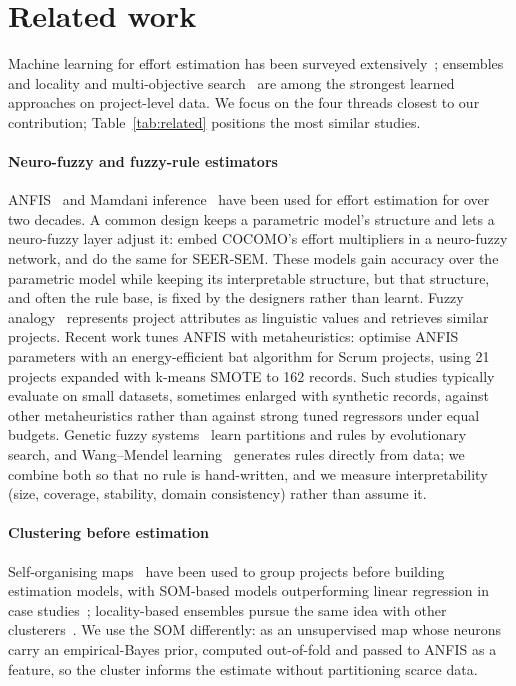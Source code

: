 \documentclass[preprint,12pt,authoryear]{elsarticle}
\begin{document}
\section{Related work}
\label{sec:related}

Machine learning for effort estimation has been surveyed extensively~\citep{wen2012slr}; ensembles and locality
\citep{minku2013ensembles} and multi-objective search~\citep{sarro2016coGEE} are among the strongest learned
approaches on project-level data.  We focus on the four threads closest to our contribution; Table~\ref{tab:related}
positions the most similar studies.

\paragraph{Neuro-fuzzy and fuzzy-rule estimators}
ANFIS~\citep{jang1993anfis} and Mamdani inference~\citep{mamdani1975} have been used for effort estimation for over
two decades.  A common design keeps a parametric model's structure and lets a neuro-fuzzy layer adjust it:
\citet{huang2007neurofuzzy} embed COCOMO's effort multipliers in a neuro-fuzzy network, and \citet{du2015seersem}
do the same for SEER-SEM.  These models gain accuracy over the parametric model while keeping its interpretable
structure, but that structure, and often the rule base, is fixed by the designers rather than learnt.  Fuzzy
analogy~\citep{idri2002fuzzyanalogy} represents project attributes as linguistic values and retrieves similar
projects.  Recent work tunes ANFIS with metaheuristics: \citet{arora2022anfis} optimise ANFIS parameters with an
energy-efficient bat algorithm for Scrum projects, using 21 projects expanded with k-means SMOTE to 162 records.
Such studies typically evaluate on small datasets, sometimes enlarged with synthetic records, against other
metaheuristics rather than against strong tuned regressors under equal budgets.  Genetic fuzzy
systems~\citep{herrera2008ga_fuzzy} learn partitions and rules by evolutionary search, and Wang--Mendel
learning~\citep{wang1992mendel} generates rules directly from data; we combine both so that no rule is
hand-written, and we measure interpretability (size, coverage, stability, domain consistency) rather than assume it.

\paragraph{Clustering before estimation}
Self-organising maps~\citep{kohonen1990som} have been used to group projects before building estimation models,
with SOM-based models outperforming linear regression in case studies~\citep{dai2011som}; locality-based ensembles
pursue the same idea with other clusterers~\citep{minku2013ensembles}.  We use the SOM differently: as an
unsupervised map whose neurons carry an empirical-Bayes prior, computed out-of-fold and passed to ANFIS as a feature,
so the cluster informs the estimate without partitioning scarce data.
\end{document}
